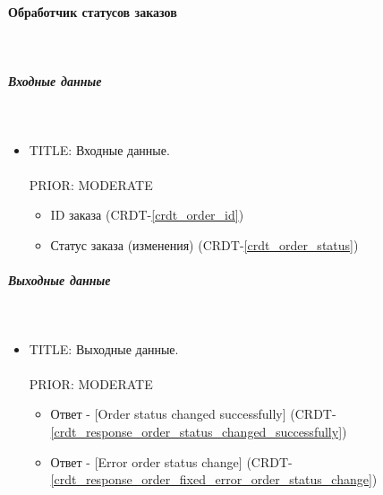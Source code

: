 \paragraph{Обработчик статусов заказов} \mbox{} \\ \label{service_order_status_processing}

	\subparagraph{Входные данные} \mbox{} \\ \label{}

      \begin{itemize}

        \item{

          TITLE: Входные данные.\\
          \\
          PRIOR: MODERATE\\

        }

          \begin{itemize}
            \item ID заказа (CRDT-\ref{crdt_order_id})
            \item Статус заказа (изменения) (CRDT-\ref{crdt_order_status})
          \end{itemize}

      \end{itemize}

    \subparagraph{Выходные данные} \mbox{} \\

      \begin{itemize}

        \item{

          TITLE: Выходные данные.\\
          \\
          PRIOR: MODERATE\\

        }

          \begin{itemize}
            \item Ответ - [Order status changed successfully] (CRDT-\ref{crdt_response_order_status_changed_successfully})
            \item Ответ - [Error order status change] (CRDT-\ref{crdt_response_order_fixed_error_order_status_change})
          \end{itemize}

      \end{itemize}

